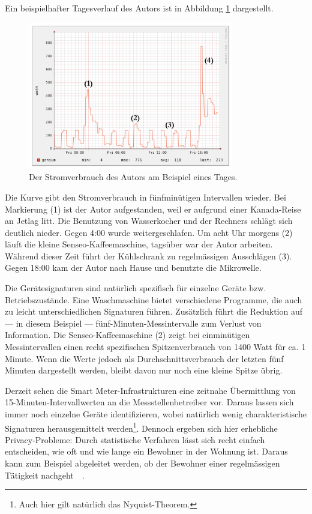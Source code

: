 \documentclass[logo]{fhgart}
\newcommand*\imgwidth{0.8\textwidth}
\begin{document}
Ein beispielhafter Tagesverlauf des Autors ist in Abbildung
\ref{fig:schlaflos} dargestellt.
\begin{figure}[htbp]
  \begin{center}
    \includegraphics[width=\imgwidth]{figures/lastkurve-md-annotated.png}
    \caption{Der Stromverbrauch des Autors am Beispiel eines Tages.}
    \label{fig:schlaflos}
  \end{center}
\end{figure}
Die Kurve gibt den Stromverbrauch in fünfminütigen Intervallen
wieder. Bei Markierung (1) ist der Autor aufgestanden, weil er aufgrund
einer Kanada-Reise an Jetlag litt. Die Benutzung von Wasserkocher und
der Rechners schlägt sich deutlich nieder. Gegen 4:00 wurde
weitergeschlafen. Um acht Uhr morgens (2) läuft die kleine
Senseo-Kaffeemaschine, tagsüber war der Autor arbeiten. Während dieser
Zeit führt der Kühlschrank zu regelmässigen Ausschlägen (3). Gegen 18:00
kam der Autor nach Hause und benutzte die Mikrowelle.

Die Gerätesignaturen sind natürlich spezifisch für einzelne Geräte bzw.
Betriebszustände. Eine Waschmaschine bietet verschiedene Programme, die
auch zu leicht unterschiedlichen Signaturen führen. Zusätzlich führt die
Reduktion auf --- in diesem Beispiel --- fünf-Minuten-Messintervalle zum
Verlust von Information. Die Senseo-Kaffeemaschine (2) zeigt bei
einminütigen Messintervallen einen recht spezifischen Spitzenverbrauch
von 1400 Watt für ca. 1 Minute. Wenn die Werte jedoch als
Durchschnittsverbrauch der letzten fünf Minuten dargestellt werden,
bleibt davon nur noch eine kleine Spitze übrig.

Derzeit sehen die Smart Meter-Infrastrukturen eine zeitnahe Übermittlung
von 15-Minuten-Intervallwerten an die Messstellenbetreiber vor. Daraus
lassen sich immer noch einzelne Geräte identifizieren, wobei natürlich
wenig charakteristische Signaturen herausgemittelt
werden\footnote{Auch hier gilt natürlich das Nyquist-Theorem.}. Dennoch
ergeben sich hier erhebliche Privacy-Probleme: Durch statistische
Verfahren lässt sich recht einfach entscheiden, wie oft und wie lange
ein Bewohner in der Wohnung ist. Daraus kann zum Beispiel abgeleitet
werden, ob der Bewohner einer regelmässigen Tätigkeit
nachgeht~\cite{mueller10verhalten}~\cite{kurz10smartmeter}. 
\end{document}

